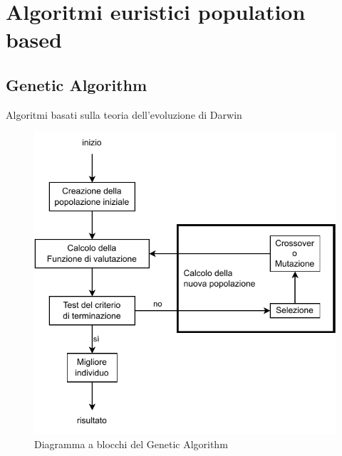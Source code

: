 \documentclass[9pt]{beamer}
\begin{document}
\section{Algoritmi euristici population based}

\subsection{Genetic Algorithm}
\begin{frame}[allowframebreaks]{\subsecname}

	Algoritmi basati sulla teoria dell’evoluzione di Darwin
      	\begin{figure}[h]
	\centering
	\includegraphics[height=0.65\textheight]
	{../images/block-diagram-genetic-algorithm}
	\caption{Diagramma a blocchi del Genetic Algorithm}
	\end{figure}

\framebreak


\end{frame}
\end{document}
